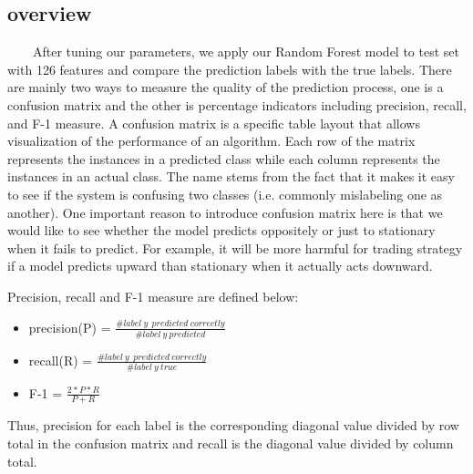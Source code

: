 \documentclass[11pt]{article}
\begin{document}
\subsection{overview}
\ \ \ \ After tuning our parameters, we apply our Random Forest model to test set with 126 features and compare the prediction labels with the true labels. There are mainly two ways to measure the quality of the prediction process, one is a confusion matrix and the other is percentage indicators including precision, recall, and F-1 measure. A confusion matrix 
is a specific table layout that allows visualization of the performance of an algorithm. Each row of the matrix represents the instances in a predicted class while each column represents the instances in an actual class. The name stems from the fact that it makes it easy to see if the system is confusing two classes (i.e. commonly mislabeling one as another).\cite{cm} One important reason to introduce confusion matrix here is that we would like to see whether the model predicts oppositely or just to stationary when it fails to predict. For example, it will be more harmful for trading strategy if a model predicts upward than stationary when it actually acts downward.
\par
Precision, recall and F-1 measure are defined below:
\begin{itemize}
\item precision(P) = $\frac{\# label\ y\ \ predicted\ correctly}{\# label\ y\ predicted}$
\item recall(R) = $\frac{\# label\ y\ \ predicted\ correctly}{\# label\ y\ true}$
\item F-1 = $\frac{2*P*R}{P+R}$
\end{itemize}
\par
Thus, precision for each label is the corresponding diagonal value divided by row total in the confusion matrix and recall is the diagonal value divided by column total. 
\end{document}
